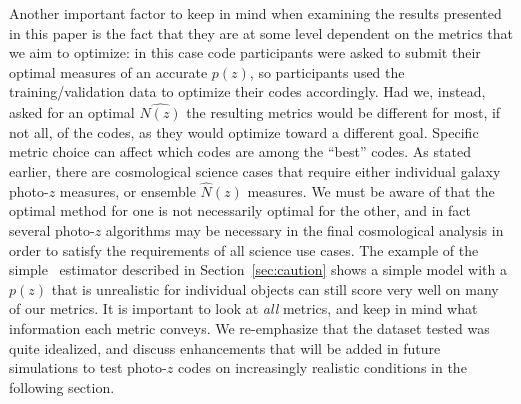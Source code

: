 Another important factor to keep in mind when examining the results presented in this paper is the fact that they are at some level dependent on the metrics that we aim to optimize: in this case code participants were asked to submit their optimal measures of an accurate $p(z)$, so participants used the training/validation data to optimize their codes accordingly.  Had we, instead, asked for an optimal $\hat{N(z)}$ the resulting metrics would be different for most, if not all, of the codes, as they would optimize toward a different goal.  Specific metric choice can affect which codes are among the ``best'' codes.  As stated earlier, there are cosmological science cases that require either individual galaxy photo-$z$ measures, or ensemble $\hat{N}(z)$ measures.  We must be aware of that the optimal method for one is not necessarily optimal for the other, and in fact several photo-$z$ algorithms may be necessary in the final cosmological analysis in order to satisfy the requirements of all science use cases.  The example of the simple \trainz\ estimator described in Section~\ref{sec:caution} shows a simple model with a $p(z)$ that is unrealistic for individual objects can still score very well on many of our metrics.  It is important to look at {\it all} metrics, and keep in mind what information each metric conveys.
We re-emphasize that the dataset tested was quite idealized, and discuss enhancements that will be added in future simulations to test photo-$z$ codes on increasingly realistic conditions in the following section.


